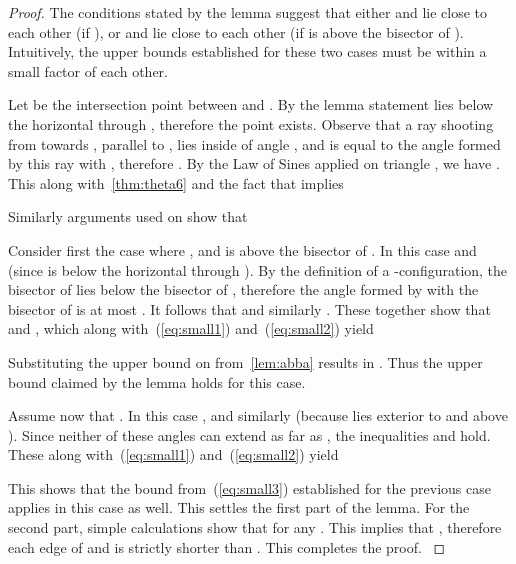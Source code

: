 \documentclass[runningheads,a4paper]{llncs}
\newcommand{\ABox}{
\raisebox{3pt}{\framebox[6pt]{\rule{6pt}{0pt}}}
}
\begin{document}
\begin{proof}
The conditions stated by the lemma suggest that either  and  lie close to each other (if ), or  and  lie close to each other (if  is above the bisector of ). Intuitively, the upper bounds established for these two cases must be within a small factor of each other.  

Let  be the intersection point between  and . By the lemma statement  lies below the horizontal through , therefore the point  exists.  
Observe that a ray shooting from  towards , parallel to , lies inside  of angle , and  is equal to the angle formed by this ray with , therefore . By the Law of Sines applied on triangle , we have 
. This along with~\autoref{thm:theta6} and the fact that  implies 

Similarly arguments used on  show that  

Consider first the case where , and  is above the bisector of . In this case  and  (since  is below the horizontal through ). By the definition of a -configuration, the bisector of  lies below the bisector of , therefore the angle formed by  with the bisector of  is at most . It follows that 
 and similarly . These together show that 
 and , which along with~(\ref{eq:small1}) and~(\ref{eq:small2}) yield 

Substituting  the upper bound on  from~\autoref{lem:abba} results in . Thus the upper bound claimed by the lemma holds for this case. 

Assume now that . In this case , and similarly  (because  lies exterior to  and above ). Since neither of these angles can extend as far as , the inequalities 
 and  hold. These along with~(\ref{eq:small1}) and~(\ref{eq:small2}) yield 

This shows that the bound from~(\ref{eq:small3}) established for the previous case applies in this case as well. This settles the first part of the lemma. For the second part, simple calculations show that  for any . This implies that , therefore each edge of  and  is strictly shorter than . This completes the proof.
{\hfill\ABox}\end{proof}
\end{document}
